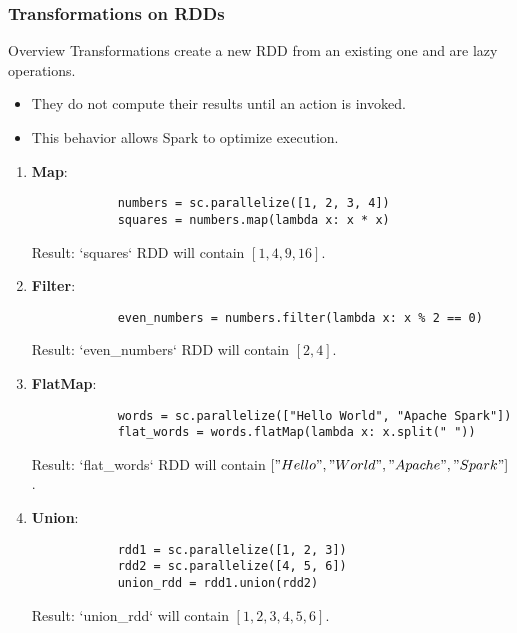 \documentclass[aspectratio=169]{beamer}
\begin{document}
\begin{frame}[fragile]
    \frametitle{Transformations on RDDs}
    \begin{block}{Overview}
        Transformations create a new RDD from an existing one and are lazy operations.
        \begin{itemize}
            \item They do not compute their results until an action is invoked.
            \item This behavior allows Spark to optimize execution.
        \end{itemize}
    \end{block}

    \begin{enumerate}
        \item \textbf{Map}:
            \begin{lstlisting}
            numbers = sc.parallelize([1, 2, 3, 4])
            squares = numbers.map(lambda x: x * x)
            \end{lstlisting}
            Result: `squares` RDD will contain \([1, 4, 9, 16]\).
        
        \item \textbf{Filter}:
            \begin{lstlisting}
            even_numbers = numbers.filter(lambda x: x % 2 == 0)
            \end{lstlisting}
            Result: `even_numbers` RDD will contain \([2, 4]\).

        \item \textbf{FlatMap}:
            \begin{lstlisting}
            words = sc.parallelize(["Hello World", "Apache Spark"])
            flat_words = words.flatMap(lambda x: x.split(" "))
            \end{lstlisting}
            Result: `flat_words` RDD will contain \(["Hello", "World", "Apache", "Spark"]\).

        \item \textbf{Union}:
            \begin{lstlisting}
            rdd1 = sc.parallelize([1, 2, 3])
            rdd2 = sc.parallelize([4, 5, 6])
            union_rdd = rdd1.union(rdd2)
            \end{lstlisting}
            Result: `union_rdd` will contain \([1, 2, 3, 4, 5, 6]\).
    \end{enumerate}
\end{frame}
\end{document}
